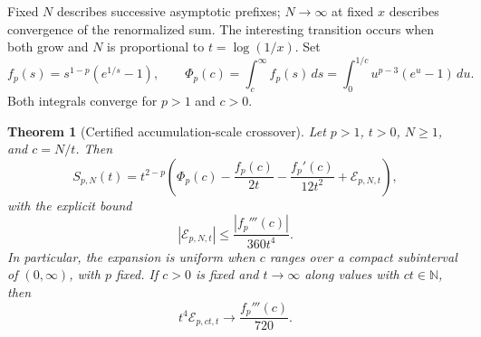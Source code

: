 \documentclass[11pt,a4paper]{article}
\numberwithin{equation}{section}
\newtheorem{theorem}{Theorem}[section]
\theoremstyle{definition}
\theoremstyle{remark}
\newcommand{\N}{\mathbb N}
\begin{document}
Fixed $N$ describes successive asymptotic prefixes; $N\to\infty$ at
fixed $x$ describes convergence of the renormalized sum. The interesting
transition occurs when both grow and $N$ is proportional to
$t=\log(1/x)$. Set
\begin{equation}\label{eq:fPhi}
 f_p(s)=s^{1-p}(e^{1/s}-1),\qquad
 \Phi_p(c)=\int_c^\infty f_p(s)\,ds
          =\int_0^{1/c}u^{p-3}(e^u-1)\,du.
\end{equation}
Both integrals converge for $p>1$ and $c>0$.

\begin{theorem}[Certified accumulation-scale crossover]
\label{thm:crossover}
Let $p>1$, $t>0$, $N\geq1$, and $c=N/t$. Then
\begin{equation}\label{eq:crossover}
 S_{p,N}(t)=t^{2-p}
 \left(\Phi_p(c)-\frac{f_p(c)}{2t}
             -\frac{f_p'(c)}{12t^2}+\mathcal E_{p,N,t}\right),
\end{equation}
with the explicit bound
\begin{equation}\label{eq:EM-bound}
 |\mathcal E_{p,N,t}|
       \leq\frac{|f_p'''(c)|}{360t^4}.
\end{equation}
In particular, the expansion is uniform when $c$ ranges over a compact
subinterval of $(0,\infty)$, with $p$ fixed. If $c>0$ is fixed and
$t\to\infty$ along values with $ct\in\N$, then
\begin{equation}\label{eq:EM-limit}
 t^4\mathcal E_{p,ct,t}\longrightarrow\frac{f_p'''(c)}{720}.
\end{equation}
\end{theorem}
\end{document}
